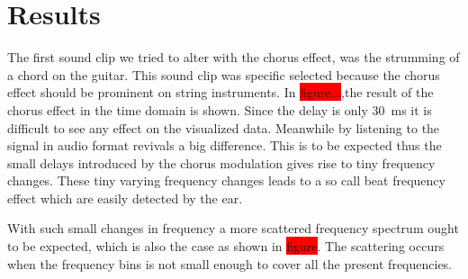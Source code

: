 
\section{Results}
The first sound clip we tried to alter with the chorus effect, was the strumming of a chord on the guitar. This sound clip was specific selected because the chorus effect should be prominent on string instruments. 
In \colorbox{red}{figure...},the result of the chorus effect in the time domain is shown. Since the delay is only \SI{30}{\milli\second} it is difficult to see any effect on the visualized data. Meanwhile by listening to the signal in audio format revivals a big difference. This is to be expected thus the small delays introduced by the chorus modulation gives rise to tiny frequency changes. These tiny varying frequency changes leads to a so call beat frequency effect which are easily detected by the ear.

With such small changes in frequency a more scattered frequency spectrum ought to be expected, which is also the case as shown in \colorbox{red}{figure}. The scattering occurs when the frequency bins is not small enough to cover all the present frequencies.
   


  
